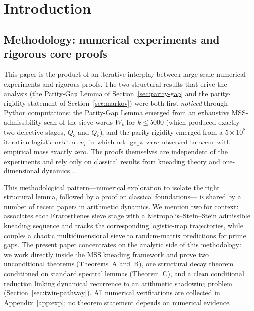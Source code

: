 \documentclass[cupthm,crop,info]{CUP-JNL-ETS}
\theoremstyle{cupplain}
\theoremstyle{cupdefinition}
\theoremstyle{cupremark}
\numberwithin{equation}{section}
\begin{document}
\begin{Frontmatter}


\end{Frontmatter}

\section{Introduction}

\subsection{Methodology: numerical experiments and rigorous core proofs}
\label{ssec:methodology}

This paper is the product of an iterative interplay between large-scale
numerical experiments and rigorous proofs. The two structural results
that drive the analysis (the Parity-Gap Lemma of
Section~\ref{sec:parity-gap} and the parity-rigidity statement of
Section~\ref{sec:markov}) were both first \emph{noticed} through Python
computations: the Parity-Gap Lemma emerged from an exhaustive
MSS-admissibility scan of the sieve words $W_k$ for $k \leq 5000$
(which produced exactly two defective stages, $Q_3$ and $Q_5$), and the
parity rigidity emerged from a $5 \times 10^8$-iteration logistic orbit
at $u_c$ in which odd gaps were observed to occur with empirical mass
exactly zero. The proofs themselves are independent of the experiments
and rely only on classical results from kneading theory and
one-dimensional dynamics
\cite{milnor1988iterated,misiurewicz1981absolutely,baladi2000positive}.

This methodological pattern---numerical exploration to isolate the
right structural lemma, followed by a proof on classical foundations---
is shared by a number of recent papers in arithmetic dynamics. We
mention two for context: \cite{wang2026emergence} associates each
Eratosthenes sieve stage with a Metropolis--Stein--Stein admissible
kneading sequence and tracks the corresponding logistic-map
trajectories, while \cite{chaoticsieve2025} couples a chaotic
multidimensional sieve to random-matrix predictions for prime gaps.
The present paper concentrates on the analytic side of this
methodology: we work directly inside the MSS kneading framework and
prove two unconditional theorems (Theorems~A and~B), one structural
decay theorem conditioned on standard spectral lemmas (Theorem~C),
and a clean conditional reduction linking dynamical recurrence to an
arithmetic shadowing problem (Section~\ref{sec:twin-pathway}). All
numerical verifications are collected in Appendix~\ref{app:exp}; no
theorem statement depends on numerical evidence.
\end{document}
